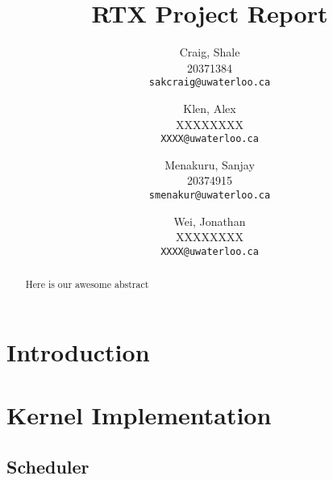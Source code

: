 \documentclass[12pt]{report}
\begin{document}

\title{RTX Project Report}

\author{
    Craig, Shale\\
    20371384\\
    \texttt{sakcraig@uwaterloo.ca}
    \and
    Klen, Alex\\
    XXXXXXXX\\
    \texttt{XXXX@uwaterloo.ca}
    \and
    Menakuru, Sanjay\\
    20374915\\
    \texttt{smenakur@uwaterloo.ca}
    \and
    Wei, Jonathan\\
    XXXXXXXX\\
    \texttt{XXXX@uwaterloo.ca}
}

\maketitle

\begin{abstract}
    Here is our awesome abstract
\end{abstract}

\tableofcontents



\part{Introduction}

\part{Kernel Implementation}

\chapter{Scheduler}
\end{document}
